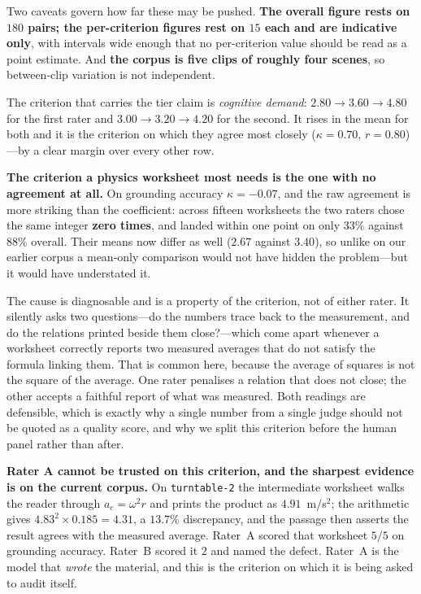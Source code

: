 \documentclass[conference]{IEEEtran}
\newcommand{\ac}{a_{c}}
\begin{document}
Two caveats govern how far these may be pushed. \textbf{The overall figure rests
on $180$ pairs; the per-criterion figures rest on $15$ each and are indicative
only}, with intervals wide enough that no per-criterion value should be read as
a point estimate. And \textbf{the corpus is five clips of roughly four scenes},
so between-clip variation is not independent.

The criterion that carries the tier claim is \emph{cognitive demand}:
$2.80 \rightarrow 3.60 \rightarrow 4.80$ for the first rater and
$3.00 \rightarrow 3.20 \rightarrow 4.20$ for the second. It rises in the mean
for both and it is the criterion on which they agree most closely
($\kappa = 0.70$, $r = 0.80$)---by a clear margin over every other row.

\textbf{The criterion a physics worksheet most needs is the one with no
agreement at all.} On grounding accuracy $\kappa = -0.07$, and the raw
agreement is more striking than the coefficient: across fifteen worksheets the
two raters chose the same integer \textbf{zero times}, and landed within one
point on only $33\%$ against $88\%$ overall. Their means now differ as well
($2.67$ against $3.40$), so unlike on our earlier corpus a mean-only comparison
would not have hidden the problem---but it would have understated it.

The cause is diagnosable and is a property of the criterion, not of either
rater. It silently asks two questions---do the numbers trace back to the
measurement, and do the relations printed beside them close?---which come apart
whenever a worksheet correctly reports two measured averages that do not satisfy
the formula linking them. That is common here, because the average of squares is
not the square of the average. One rater penalises a relation that does not
close; the other accepts a faithful report of what was measured. Both readings
are defensible, which is exactly why a single number from a single judge should
not be quoted as a quality score, and why we split this criterion before the
human panel rather than after.

\textbf{Rater A cannot be trusted on this criterion, and the sharpest evidence
is on the current corpus.} On \texttt{turntable-2} the intermediate worksheet
walks the reader through $\ac = \omega^{2}r$ and prints the product as
$4.91$~m/s$^{2}$; the arithmetic gives $4.83^{2} \times 0.185 = 4.31$, a
$13.7\%$ discrepancy, and the passage then asserts the result agrees with the
measured average. Rater~A scored that worksheet $5/5$ on grounding accuracy.
Rater~B scored it $2$ and named the defect. Rater~A is the model that
\emph{wrote} the material, and this is the criterion on which it is being asked
to audit itself.
\end{document}
